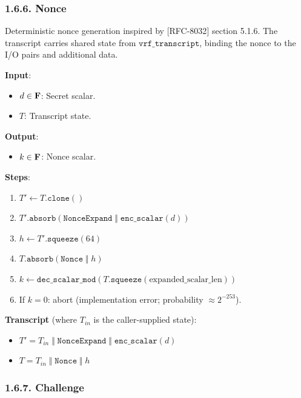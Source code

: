 \documentclass[
]{article}
\providecommand{\tightlist}{%
  \setlength{\itemsep}{0pt}\setlength{\parskip}{0pt}}
\begin{document}
\subsubsection{1.6.6. Nonce}\label{nonce}

Deterministic nonce generation inspired by {[}RFC-8032{]} section 5.1.6.
The transcript carries shared state from \(\texttt{vrf\_transcript}\),
binding the nonce to the I/O pairs and additional data.

\textbf{Input}:

\begin{itemize}
\tightlist
\item
  \(d \in \bold{F}\): Secret scalar.
\item
  \(T\): Transcript state.
\end{itemize}

\textbf{Output}:

\begin{itemize}
\tightlist
\item
  \(k \in \bold{F}\): Nonce scalar.
\end{itemize}

\textbf{Steps}:

\begin{enumerate}
\def\labelenumi{\arabic{enumi}.}
\tightlist
\item
  \(T' \gets T.\texttt{clone}()\)
\item
  \(T'.\texttt{absorb}(\texttt{NonceExpand} \;\Vert\; \texttt{enc\_scalar}(d))\)
\item
  \(h \gets T'.\texttt{squeeze}(64)\)
\item
  \(T.\texttt{absorb}(\texttt{Nonce} \;\Vert\; h)\)
\item
  \(k \gets \texttt{dec\_scalar\_mod}(T.\texttt{squeeze}(\text{expanded\_scalar\_len}))\)
\item
  If \(k = 0\): abort (implementation error; probability
  \(\approx 2^{-253}\)).
\end{enumerate}

\textbf{Transcript} (where \(T_{in}\) is the caller-supplied state):

\begin{itemize}
\tightlist
\item
  \(T' = T_{in} \;\Vert\; \texttt{NonceExpand} \;\Vert\; \texttt{enc\_scalar}(d)\)
\item
  \(T = T_{in} \;\Vert\; \texttt{Nonce} \;\Vert\; h\)
\end{itemize}

\subsubsection{1.6.7. Challenge}\label{challenge}
\end{document}
